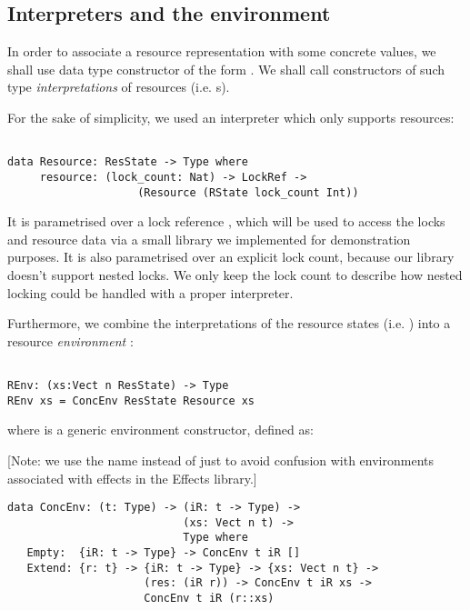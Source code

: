 \subsection{Interpreters and the environment}

In order to associate a  resource representation with some
concrete values, we shall use data type constructor of the form
. We shall call constructors of such type
\emph{interpretations} of resources (i.e. s).

For the sake of simplicity, we used an interpreter which only
supports  resources:

\begin{BVerbatim}

data Resource: ResState -> Type where
     resource: (lock_count: Nat) -> LockRef ->
                    (Resource (RState lock_count Int))

\end{BVerbatim}

It is parametrised over a lock reference , which will be used to
access the locks and resource data via a small library we implemented for
demonstration purposes. It is also parametrised over an explicit lock count,
because our library doesn't support nested locks. We only keep the
lock count to describe how nested locking could be handled with a proper
interpreter.

Furthermore, we combine the interpretations of the resource states (i.e.
) into a resource \emph{environment} :

\begin{BVerbatim}

REnv: (xs:Vect n ResState) -> Type
REnv xs = ConcEnv ResState Resource xs

\end{BVerbatim}

where  is a generic environment constructor, defined as:

[Note: we use the name  instead of just  to avoid
confusion with environments associated with effects in the Effects library.]

\begin{BVerbatim}
data ConcEnv: (t: Type) -> (iR: t -> Type) ->
                           (xs: Vect n t) ->
                           Type where
   Empty:  {iR: t -> Type} -> ConcEnv t iR []
   Extend: {r: t} -> {iR: t -> Type} -> {xs: Vect n t} ->
                     (res: (iR r)) -> ConcEnv t iR xs ->
                     ConcEnv t iR (r::xs)
\end{BVerbatim}

